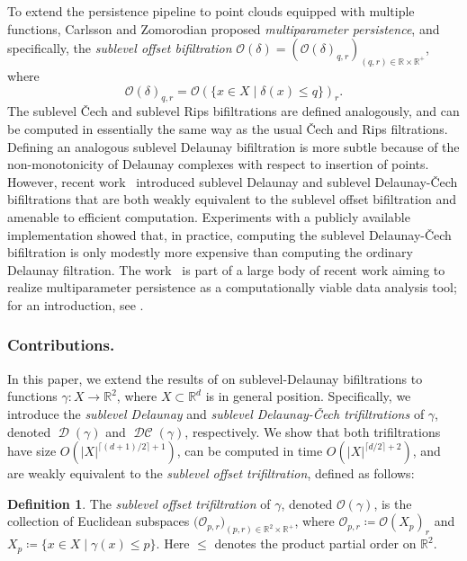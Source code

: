 \documentclass[11pt]{amsart}
\newcommand{\R}{\mathbb{R}} %
\DeclareMathOperator{\Del}{\mathcal{D}}
\DeclareMathOperator{\DelCech}{\mathcal{DC}}
\newcommand{\deff}{\emph}
\newcommand{\Offset}[0]{\mathcal{O}}
\renewcommand{\subparagraph}[1]{\subsubsection*{\textbf{\textup{#1}}}}
\theoremstyle{plain}
\theoremstyle{definition}
\newtheorem{definition}[theorem]{Definition}
\theoremstyle{remark}
\newcommand{\SizeBound}{{\lceil (d+1)/2 \rceil + 1}}
\newcommand{\CompBound}{{\lceil d/2\rceil +2}}
\begin{document}
To extend the persistence pipeline to point clouds equipped with multiple functions, Carlsson and Zomorodian \cite{carlsson2009theory} proposed \emph{multiparameter persistence}, and specifically, the \emph{sublevel offset bifiltration} $\Offset(\delta) = \left( \Offset(\delta)_{q,r} \right)_{(q,r)\in \R\times \R^{+}}$, where \[\Offset(\delta)_{q,r}=\Offset(\{x\in X\mid \delta(x)\leq q\})_{r}.\]
The sublevel {\v C}ech and sublevel Rips bifiltrations are defined analogously, and can be computed in essentially the same way as the usual \v Cech and Rips filtrations.  
%
Defining an analogous sublevel Delaunay bifiltration is more subtle because of the non-monotonicity of Delaunay complexes with respect to insertion of points.  
However, recent work~\cite{alonsoDelaunayBifiltrationsFunctions2024} introduced sublevel Delaunay and sublevel Delaunay-\v Cech bifiltrations that are both weakly equivalent to the sublevel offset bifiltration and amenable to efficient computation.  Experiments with a publicly available implementation showed that, in practice, computing the sublevel Delaunay-\v Cech bifiltration is only modestly more expensive than computing the ordinary Delaunay filtration.  The work~\cite{alonsoDelaunayBifiltrationsFunctions2024} is part of a large body of recent work aiming to realize multiparameter persistence as a computationally viable data analysis tool; for an introduction, see \cite{botnan2023introduction}.  
%
\subparagraph{Contributions.}
In this paper, we extend the results of \cite{alonsoDelaunayBifiltrationsFunctions2024} on sublevel-Delaunay bifiltrations to functions $\gamma\colon X \to \R^2$, where $X\subset \R^d$ is in general position. Specifically, we introduce the \emph{sublevel Delaunay} and \emph{sublevel Delaunay-\v{C}ech trifiltrations} of $\gamma$, denoted $\Del(\gamma)$ and $\DelCech(\gamma)$, respectively. We show that both trifiltrations have size $O(|X|^{\SizeBound})$, can be computed in time $O(|X|^\CompBound)$, and are weakly equivalent to the \emph{sublevel offset trifiltration}, defined as follows:
 \begin{definition}
The \deff{sublevel offset trifiltration} of $\gamma$, denoted $\Offset(\gamma)$, is the collection of Euclidean subspaces $\bigl(\Offset_{p,r}\bigr)_{(p,r)\in \mathbb{R}^2 \times \mathbb{R}^{+}}$,
where
$\Offset_{p,r} \coloneqq \Offset(X_p)_r$ and 
$X_p \coloneqq \{x \in X \mid \gamma(x) \le p\}.$
%
Here $\le$ denotes the product partial order on $\mathbb{R}^2$.\end{definition}
\end{document}
